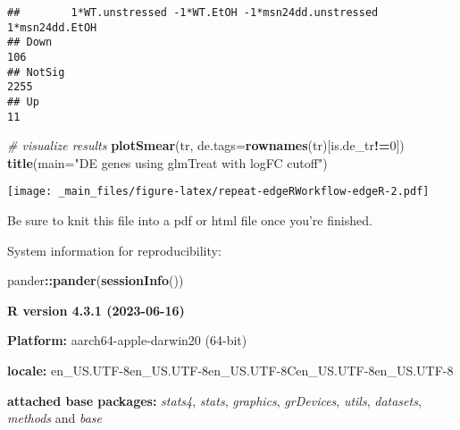 \documentclass[
]{book}
\newenvironment{Shaded}{\begin{snugshade}}{\end{snugshade}}
\newcommand{\AttributeTok}[1]{\textcolor[rgb]{0.13,0.29,0.53}{#1}}
\newcommand{\CommentTok}[1]{\textcolor[rgb]{0.56,0.35,0.01}{\textit{#1}}}
\newcommand{\DecValTok}[1]{\textcolor[rgb]{0.00,0.00,0.81}{#1}}
\newcommand{\FunctionTok}[1]{\textcolor[rgb]{0.13,0.29,0.53}{\textbf{#1}}}
\newcommand{\NormalTok}[1]{#1}
\newcommand{\SpecialCharTok}[1]{\textcolor[rgb]{0.81,0.36,0.00}{\textbf{#1}}}
\newcommand{\StringTok}[1]{\textcolor[rgb]{0.31,0.60,0.02}{#1}}
\begin{document}
\begin{verbatim}
##        1*WT.unstressed -1*WT.EtOH -1*msn24dd.unstressed 1*msn24dd.EtOH
## Down                                                               106
## NotSig                                                            2255
## Up                                                                  11
\end{verbatim}

\begin{Shaded}
\begin{Highlighting}[]
\CommentTok{\# visualize results}
\FunctionTok{plotSmear}\NormalTok{(tr, }\AttributeTok{de.tags=}\FunctionTok{rownames}\NormalTok{(tr)[is.de\_tr}\SpecialCharTok{!=}\DecValTok{0}\NormalTok{])}
\FunctionTok{title}\NormalTok{(}\AttributeTok{main=}\StringTok{"DE genes using glmTreat with logFC cutoff"}\NormalTok{)}
\end{Highlighting}
\end{Shaded}

\texttt{[image: \_main\_files/figure-latex/repeat-edgeRWorkflow-edgeR-2.pdf]}

Be sure to knit this file into a pdf or html file once you're finished.

System information for reproducibility:

\begin{Shaded}
\begin{Highlighting}[]
\NormalTok{pander}\SpecialCharTok{::}\FunctionTok{pander}\NormalTok{(}\FunctionTok{sessionInfo}\NormalTok{())}
\end{Highlighting}
\end{Shaded}

\textbf{R version 4.3.1 (2023-06-16)}

\textbf{Platform:} aarch64-apple-darwin20 (64-bit)

\textbf{locale:}
en\_US.UTF-8\textbar\textbar en\_US.UTF-8\textbar\textbar en\_US.UTF-8\textbar\textbar C\textbar\textbar en\_US.UTF-8\textbar\textbar en\_US.UTF-8

\textbf{attached base packages:}
\emph{stats4}, \emph{stats}, \emph{graphics}, \emph{grDevices}, \emph{utils}, \emph{datasets}, \emph{methods} and \emph{base}
\end{document}
